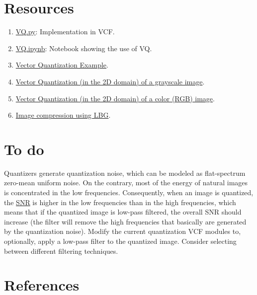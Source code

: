 \section*{Resources}

\begin{enumerate}
  \item \href{https://github.com/Sistemas-Multimedia/VCF/blob/main/src/VQ.py}{VQ.py}: Implementation in VCF.
  \item \href{https://github.com/Sistemas-Multimedia/VCF/blob/main/notebooks/VQ.ipynb}{VQ.ipynb}: Notebook showing the use of VQ.
\item
  \href{https://scikit-learn.org/stable/auto_examples/cluster/plot_face_compress.html#sphx-glr-auto-examples-cluster-plot-face-compress-py}{Vector
    Quantization Example}.
\item
  \href{https://github.com/vicente-gonzalez-ruiz/vector_quantization/blob/main/docs/gray_VQ.ipynb}{Vector
    Quantization (in the 2D domain) of a grayscale image}.
\item
  \href{https://github.com/vicente-gonzalez-ruiz/vector_quantization/blob/main/docs/spatial_color_VQ.ipynb}{Vector
    Quantization (in the 2D domain) of a color (RGB) image}.
  
\item \href{https://github.com/droidadroit/LBG}{Image compression using LBG}.
\end{enumerate}

\section*{To do}
Quantizers generate quantization noise, which can be modeled as
flat-spectrum zero-mean uniform noise. On the contrary, most of the
energy of natural images is concentrated in the low
frequencies. Consequently, when an image is quantized, the
\href{https://en.wikipedia.org/wiki/Signal-to-noise_ratio}{SNR} is
higher in the low frequencies than in the high frequencies, which
means that if the quantized image is low-pass filtered, the overall
SNR should increase (the filter will remove the high frequencies that
basically are generated by the quantization noise). Modify the current
quantization VCF modules to, optionally, apply a low-pass filter to
the quantized image. Consider selecting between different filtering
techniques.

\section{References}

\renewcommand{\addcontentsline}[3]{}%


